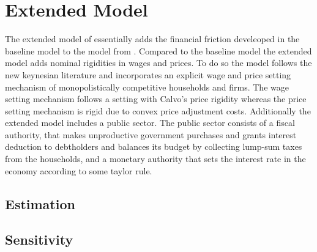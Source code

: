 \section{Extended Model}
\label{sec:extended_model}

The extended model of \textcite{jerman_macroeconomic_2012} essentially
adds the financial friction develeoped in the baseline model to the
model from \textcite{smets_shocks_2007}. Compared to the baseline model the
extended model adds nominal rigidities in wages and prices. To do so the model
follows the new keynesian literature and incorporates an explicit wage and
price setting mechanism of monopolistically competitive households and
firms. The wage setting mechanism follows a setting with Calvo's price
rigidity \parencite{calvo_staggered_1983} whereas the price setting mechanism
is rigid due to convex price adjustment costs. Additionally the extended model
includes a public sector. The public sector consists of a fiscal authority, that
makes unproductive government purchases and grants interest deduction to
debtholders and balances its budget by collecting lump-sum taxes from the
households, and a monetary authority that sets the interest rate in the economy
according to some taylor rule.

\subsection{Estimation}
\label{sec:estimation}

\blindtext

\begin{table}
  \centering
  \caption{Table 3 - Parameterization}
  \label{tab:estimation}
\end{table}

\subsection{Sensitivity}
\label{sec:sensitivity}

\blindtext


